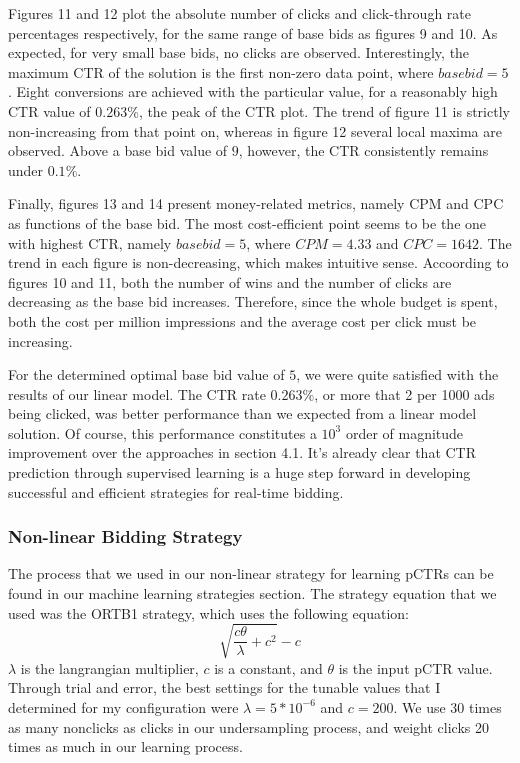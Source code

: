 \documentclass{sig-alternate-05-2015}
\begin{document}
Figures 11 and 12 plot the absolute number of clicks and click-through rate percentages respectively, for the same range of base bids as figures 9 and 10. As expected, for very small base bids, no clicks are observed. Interestingly, the maximum CTR of the solution is the first non-zero data point, where $base bid = 5$. Eight conversions are achieved with the particular value, for a reasonably high CTR value of $0.263\%$, the peak of the CTR plot. The trend of figure 11 is strictly non-increasing from that point on, whereas in figure 12 several local maxima are observed. Above a base bid value of $9$, however, the CTR consistently remains under $0.1\%$.

Finally, figures 13 and 14 present money-related metrics, namely CPM and CPC as functions of the base bid. The most cost-efficient point seems to be the one with highest CTR, namely $base bid = 5$, where $CPM = 4.33$ and $CPC = 1642$. The trend in each figure is non-decreasing, which makes intuitive sense. Accoording to figures 10 and 11, both the number of wins and the number of clicks are decreasing as the base bid increases. Therefore, since the whole budget is spent, both the cost per million impressions and the average cost per click must be increasing.

For the determined optimal base bid value of $5$, we were quite satisfied with the results of our linear model. The CTR rate $0.263\%$, or more that 2 per 1000 ads being clicked, was better performance than we expected from a linear model solution. Of course, this performance constitutes a $10^3$ order of magnitude improvement over the approaches in section 4.1. It's already clear that CTR prediction through supervised learning is a huge step forward in developing successful and efficient strategies for real-time bidding.

\subsubsection{Non-linear Bidding Strategy}

The process that we used in our non-linear strategy for learning pCTRs can be found in our machine learning strategies section. The strategy equation that we used was the ORTB1 strategy\cite{ORTB}, which uses the following equation:
\begin{equation}\sqrt{\frac{c\theta}{\lambda}+c^2}-c\end{equation}
$\lambda$ is the langrangian multiplier, $c$ is a constant, and $\theta$ is
the input pCTR value. Through trial and error, the best settings for the
tunable values that I determined for my configuration were $\lambda=5*10^{-6}$ and
$c=200$. We use 30 times as many nonclicks as clicks in our undersampling process,
and weight clicks 20 times as much in our learning process.
\end{document}
